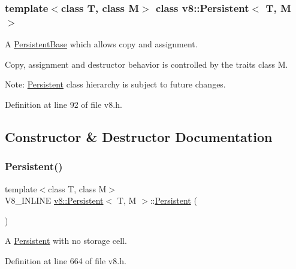 \subsubsection*{template$<$class T, class M$>$\newline
class v8\+::\+Persistent$<$ T, M $>$}

A \mbox{\hyperlink{classv8_1_1PersistentBase}{Persistent\+Base}} which allows copy and assignment.

Copy, assignment and destructor behavior is controlled by the traits class M.

Note\+: \mbox{\hyperlink{classv8_1_1Persistent}{Persistent}} class hierarchy is subject to future changes. 

Definition at line 92 of file v8.\+h.



\subsection{Constructor \& Destructor Documentation}
\mbox{\label{classv8_1_1Persistent_a5ce14612215393683d814056015a102d}} 
\subsubsection{\texorpdfstring{Persistent()}{Persistent()}\hspace{0.1cm}{\footnotesize\ttfamily [1/4]}}
{\footnotesize\ttfamily template$<$class T, class M$>$ \\
V8\+\_\+\+I\+N\+L\+I\+NE \mbox{\hyperlink{classv8_1_1Persistent}{v8\+::\+Persistent}}$<$ T, M $>$\+::\mbox{\hyperlink{classv8_1_1Persistent}{Persistent}} (\begin{DoxyParamCaption}{ }\end{DoxyParamCaption})\hspace{0.3cm}{\ttfamily [inline]}}

A \mbox{\hyperlink{classv8_1_1Persistent}{Persistent}} with no storage cell. 

Definition at line 664 of file v8.\+h.

\mbox{\label{classv8_1_1Persistent_aabe9a42d7971bd31173bca34186d9ac2}} 
